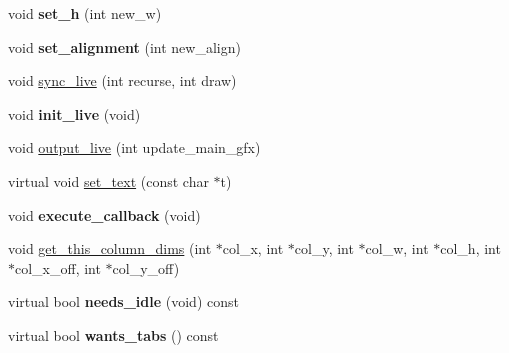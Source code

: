\begin{DoxyCompactItemize}
\item 
\hypertarget{classGLUI__Control_acc29b79df3861b1910b2a41e0e8d2822}{void {\bfseries set\-\_\-h} (int new\-\_\-w)}\label{classGLUI__Control_acc29b79df3861b1910b2a41e0e8d2822}

\item 
\hypertarget{classGLUI__Control_ad853d2029a306239daa3c9af6c36730d}{void {\bfseries set\-\_\-alignment} (int new\-\_\-align)}\label{classGLUI__Control_ad853d2029a306239daa3c9af6c36730d}

\item 
void \hyperlink{classGLUI__Control_a56a06a9b1272eb0a537ea01a6c002cf8}{sync\-\_\-live} (int recurse, int draw)
\item 
\hypertarget{classGLUI__Control_a4d56b92f8b6454c3f64ba6f0ef5470b8}{void {\bfseries init\-\_\-live} (void)}\label{classGLUI__Control_a4d56b92f8b6454c3f64ba6f0ef5470b8}

\item 
void \hyperlink{classGLUI__Control_ac7417112964d4c5134d4453835a0da99}{output\-\_\-live} (int update\-\_\-main\-\_\-gfx)
\item 
virtual void \hyperlink{classGLUI__Control_a44fab5a8af3c58865bc2cd8bfd596af8}{set\-\_\-text} (const char $\ast$t)
\item 
\hypertarget{classGLUI__Control_a76fe9cee85c7a296610a73b0ba12aa9c}{void {\bfseries execute\-\_\-callback} (void)}\label{classGLUI__Control_a76fe9cee85c7a296610a73b0ba12aa9c}

\item 
void \hyperlink{classGLUI__Control_a0cb273fd3dca9fb84809a4d350668c32}{get\-\_\-this\-\_\-column\-\_\-dims} (int $\ast$col\-\_\-x, int $\ast$col\-\_\-y, int $\ast$col\-\_\-w, int $\ast$col\-\_\-h, int $\ast$col\-\_\-x\-\_\-off, int $\ast$col\-\_\-y\-\_\-off)
\item 
\hypertarget{classGLUI__Control_aab6d8bb823a01dc13892e68b796ef29c}{virtual bool {\bfseries needs\-\_\-idle} (void) const }\label{classGLUI__Control_aab6d8bb823a01dc13892e68b796ef29c}

\item 
\hypertarget{classGLUI__Control_a42a65c9dbc0690e270a8c0033fbc1845}{virtual bool {\bfseries wants\-\_\-tabs} () const }\label{classGLUI__Control_a42a65c9dbc0690e270a8c0033fbc1845}

\end{DoxyCompactItemize}
